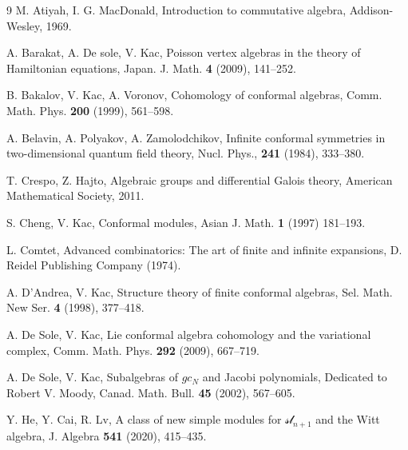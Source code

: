 \documentclass[12pt]{amsart}
\begin{document}
\begin{thebibliography}{9}
  M. Atiyah, I. G. MacDonald, Introduction to commutative algebra, Addison-Wesley, 1969.

 A. Barakat, A. De sole, V. Kac, Poisson vertex algebras in the theory of Hamiltonian equations, Japan. J. Math. {\bf 4} (2009), 141--252.

 B. Bakalov, V. Kac, A. Voronov, Cohomology of conformal algebras,  Comm. Math. Phys. {\bf 200} (1999), 561--598.

A. Belavin, A. Polyakov, A. Zamolodchikov, Infinite conformal symmetries in two-dimensional quantum field theory, Nucl. Phys., {\bf 241} (1984), 333--380.

T. Crespo, Z. Hajto, Algebraic groups and differential Galois theory, %
American Mathematical Society, 2011.

 S. Cheng, V. Kac, Conformal modules, Asian
J. Math. {\bf 1} (1997) 181--193.


 L. Comtet, Advanced combinatorics: The art of finite and infinite expansions, D. Reidel Publishing Company (1974).

 A. D'Andrea, V. Kac, Structure theory of finite
conformal algebras, Sel. Math. New Ser. {\bf 4} (1998),
377--418.

A. De Sole, V. Kac, Lie conformal algebra cohomology and the variational complex, Comm. Math. Phys. {\bf 292} (2009), 667--719.

A. De Sole, V. Kac, Subalgebras of $gc_N$ and Jacobi polynomials, Dedicated to Robert V. Moody, Canad. Math. Bull. {\bf 45} (2002), 567--605.



 Y. He, Y. Cai, R. Lv, A class of new simple modules for $\mathcal{sl}_{n+1}$ and the Witt algebra, J. Algebra {\bf 541} (2020), 415--435.


\end{thebibliography}
\end{document}
